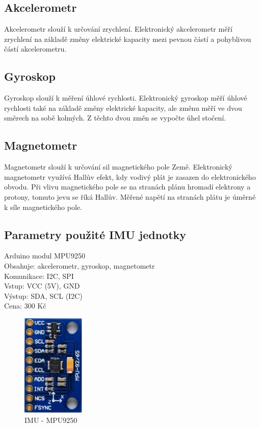 \subsection{Akcelerometr}
Akcelerometr slouží k určování zrychlení. Elektronický akcelerometr měří zrychlení na základě  změny elektrické kapacity mezi pevnou částí a pohyblivou částí akcelerometru. \\

\subsection{Gyroskop}
Gyroskop slouží k měření úhlové rychlosti.  Elektronický gyroskop měří úhlové rychlosti také na základě změny elektrické kapacity, ale změnu měří ve dvou směrech na sobě kolmých. Z těchto dvou změn se vypočte úhel stočení.\\

\subsection{Magnetometr}
Magnetometr slouží k určování sil magnetického pole Země. Elektronický magnetometr využívá Hallův efekt, kdy vodivý plát je zasazen do elektronického obvodu. Při vlivu magnetického pole se na stranách plánu hromadí elektrony a protony, tomuto jevu se říká Hallův. Měřené napětí na stranách plátu je úměrné k síle magnetického pole.\\

\subsection{Parametry použité IMU jednotky}
Arduino modul MPU9250\\
Obsahuje: akcelerometr, gyroskop, magnetometr\\
Komunikace: I2C, SPI\\
Vstup: VCC (5V), GND\\
Výstup: SDA, SCL (I2C)\\
Cena: 300 Kč\\
\begin{figure}[h]
	\centering
	\includegraphics[width=3cm]{pictures/imu.jpg}
	\caption{IMU - MPU9250}
\end{figure}
 
